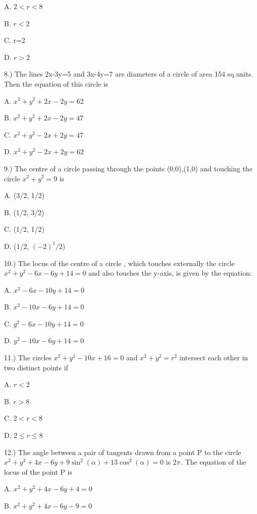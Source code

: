 \documentclass{article}
\begin{document}
\choice  A. $2 < r< 8$

\choice  B. $r < 2$

\choice  C. r=2

\choice  D. $r > 2$

\vspace{5mm}
8.) The lines 2x-3y=5 and 3x-4y=7 are diameters of a circle of area 154 sq.units. Then the equation of this circle is

\choice  A. $x^2+y^2+2x-2y=62$

\choice  B. $x^2+y^2+2x-2y=47$

\choice  C. $x^2+y^2-2x+2y=47$

\choice  D. $x^2+y^2-2x+2y=62$

\vspace{5mm}
9.) The centre of a circle passing through the points (0,0),(1,0) and touching the circle $x^2+y^2=9$  is

\choice  A. (3/2, 1/2)

\choice  B. (1/2, 3/2)

\choice  C. (1/2, 1/2)

\choice  D. (1/2, $(-2)^ 1/2$)

\vspace{5mm}
10.) The locus of the centre of a circle , which touches externally the circle $x^2+y^2-6x-6y+14=0$ and also touches the y-axis, is given by the equation:

\choice  A. $x^2-6x-10y+14=0$

\choice  B. $x^2-10x-6y+14=0$

\choice  C. $y^2-6x-10y+14=0$

\choice  D. $y^2-10x-6y+14=0$

\vspace{5mm}
11.) The circles $x^2+y^2-10x+16=0$ and $x^2+y^2=r^2$ intersect each other in two distinct points if

\choice  A. $ r< 2 $

\choice  B. $ r > 8 $

\choice  C. $ 2 < r < 8 $

\choice  D. $ 2 \leq r \leq  8 $

\vspace{5mm}
12.) The angle between a pair of tangents drawn  from a point P  to the circle $x^2+y^2+4x-6y+9\sin ^2(\alpha )+13\cos^2(\alpha )=0$ is 2$\pi_{}$. The equation of the locus of the point P is 

\choice  A. $x^2+y^2+4x-6y+4=0$

\choice  B. $x^2+y^2+4x-6y-9=0$
\end{document}
